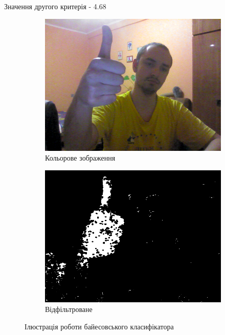 Значення другого критерія - 4.68%

\begin{figure}[H]
	\centering
	\begin{subfigure}[b]{0.45\textwidth}
		\includegraphics[width=\textwidth]{practise/img/b_color2}
		\caption{Кольорове зображення}
	\end{subfigure}
	\hfill
	\begin{subfigure}[b]{0.45\textwidth}
		\includegraphics[width=\textwidth]{practise/img/b_mask2}
		\caption{Відфільтроване}
	\end{subfigure}
	\caption{Ілюстрація роботи байесовського класифікатора}
	\label{fig:bayesian2}
\end{figure}

